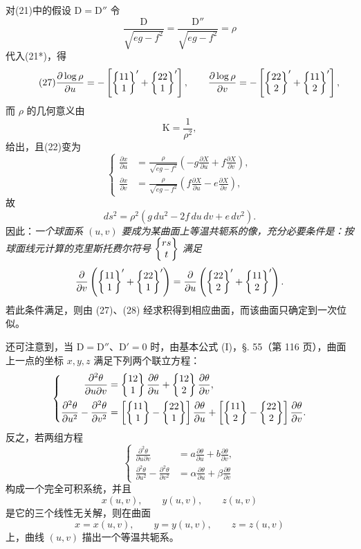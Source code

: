 对(21)中的假设 \(\mathrm D=\mathrm D''\) 令
\[
 \frac{\mathrm D}{\sqrt{eg-f^2}}=\frac{\mathrm D''}{\sqrt{eg-f^2}}=\rho
\]
代入(21*)，得
\begin{equation}\tag{27}
 \frac{\partial\log\rho}{\partial u}=-\left[\left\{\begin{matrix}11\\1\end{matrix}\right\}'+\left\{\begin{matrix}22\\1\end{matrix}\right\}'\right],
 \qquad
 \frac{\partial\log\rho}{\partial v}=-\left[\left\{\begin{matrix}22\\2\end{matrix}\right\}'+\left\{\begin{matrix}11\\2\end{matrix}\right\}'\right],
\end{equation}
而 \(\rho\) 的几何意义由
\begin{equation}\tag{27*}
 \mathrm K=\frac1{\rho^2},
\end{equation}
给出，且(22)变为
\begin{equation}\tag{28}
\left\{
\begin{aligned}
\frac{\partial x}{\partial u}&=\frac{\rho}{\sqrt{eg-f^2}}\left(-g\frac{\partial X}{\partial u}+f\frac{\partial X}{\partial v}\right),\\
\frac{\partial x}{\partial v}&=\frac{\rho}{\sqrt{eg-f^2}}\left(f\frac{\partial X}{\partial u}-e\frac{\partial X}{\partial v}\right),
\end{aligned}\right.
\end{equation}
故
\[
 ds^2=\rho^2(g\,du^2-2f\,du\,dv+e\,dv^2).
\]
因此：\emph{一个球面系 \((u,v)\) 要成为某曲面上等温共轭系的像，充分必要条件是：按球面线元计算的克里斯托费尔符号 \(\left\{\begin{matrix}rs\\t\end{matrix}\right\}\) 满足}
\[
 \frac{\partial}{\partial v}\left(\left\{\begin{matrix}11\\1\end{matrix}\right\}'+\left\{\begin{matrix}22\\1\end{matrix}\right\}'\right)
 =\frac{\partial}{\partial u}\left(\left\{\begin{matrix}22\\2\end{matrix}\right\}'+\left\{\begin{matrix}11\\2\end{matrix}\right\}'\right).
\]
若此条件满足，则由 (27)、(28) 经求积得到相应曲面，而该曲面只确定到一次位似。

还可注意到，当 \(\mathrm D=\mathrm D''\)、\(\mathrm D'=0\) 时，由基本公式 (I)，\S. 55（第 116 页），曲面上一点的坐标 \(x,y,z\) 满足下列两个联立方程：
\[
\left\{
\begin{aligned}
\frac{\partial^2\theta}{\partial u\partial v}&=\left\{\begin{matrix}12\\1\end{matrix}\right\}\frac{\partial\theta}{\partial u}+\left\{\begin{matrix}12\\2\end{matrix}\right\}\frac{\partial\theta}{\partial v},\\
\frac{\partial^2\theta}{\partial u^2}-\frac{\partial^2\theta}{\partial v^2}&=\left[\left\{\begin{matrix}11\\1\end{matrix}\right\}-\left\{\begin{matrix}22\\1\end{matrix}\right\}\right]\frac{\partial\theta}{\partial u}+
\left[\left\{\begin{matrix}11\\2\end{matrix}\right\}-\left\{\begin{matrix}22\\2\end{matrix}\right\}\right]\frac{\partial\theta}{\partial v}.
\end{aligned}\right.
\]
反之，若两组方程
\[
\left\{
\begin{aligned}
\frac{\partial^2\theta}{\partial u\partial v}&=a\frac{\partial\theta}{\partial u}+b\frac{\partial\theta}{\partial v},\\
\frac{\partial^2\theta}{\partial u^2}-\frac{\partial^2\theta}{\partial v^2}&=\alpha\frac{\partial\theta}{\partial u}+\beta\frac{\partial\theta}{\partial v}
\end{aligned}\right.
\]
构成一个完全可积系统，并且
\[
 x(u,v),
 \qquad
 y(u,v),
 \qquad
 z(u,v)
\]
是它的三个线性无关解，则在曲面
\[
 x=x(u,v),
 \qquad
 y=y(u,v),
 \qquad
 z=z(u,v)
\]
上，曲线 \((u,v)\) 描出一个等温共轭系。

